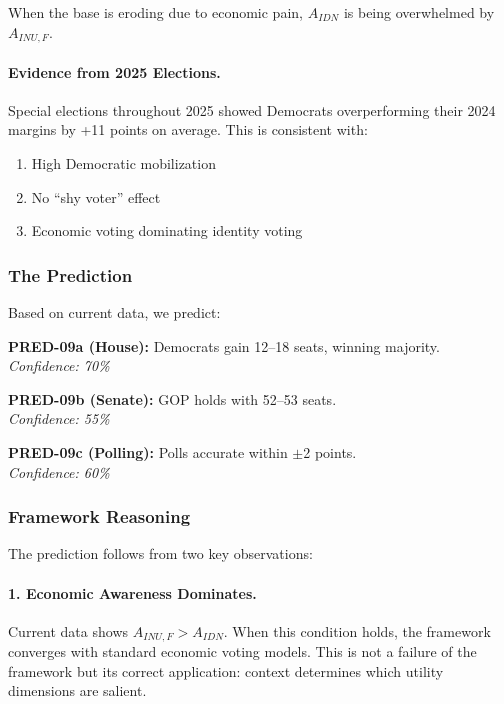 When the base is eroding due to economic pain, $A_{IDN}$ is being 
overwhelmed by $A_{INU,F}$.

\paragraph{Evidence from 2025 Elections.}
Special elections throughout 2025 showed Democrats overperforming 
their 2024 margins by +11 points on average. This is consistent with:
\begin{enumerate}
    \item High Democratic mobilization
    \item No ``shy voter'' effect
    \item Economic voting dominating identity voting
\end{enumerate}

\subsubsection{The Prediction}

Based on current data, we predict:

\begin{tcolorbox}[colback=blue!5!white, colframe=blue!75!black, title=PRED-09: US Midterm Elections 2026]
\textbf{PRED-09a (House):} Democrats gain 12--18 seats, winning majority. \\
\textit{Confidence: 70\%}

\textbf{PRED-09b (Senate):} GOP holds with 52--53 seats. \\
\textit{Confidence: 55\%}

\textbf{PRED-09c (Polling):} Polls accurate within $\pm$2 points. \\
\textit{Confidence: 60\%}
\end{tcolorbox}

\subsubsection{Framework Reasoning}

The prediction follows from two key observations:

\paragraph{1. Economic Awareness Dominates.}
Current data shows $A_{INU,F} > A_{IDN}$. When this condition holds, 
the framework converges with standard economic voting models. This is 
not a failure of the framework but its correct application: context 
determines which utility dimensions are salient.

